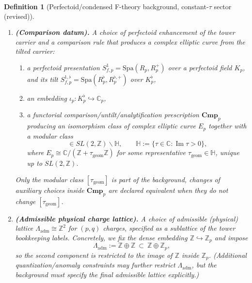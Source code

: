 \documentclass[11pt]{article}
\newtheorem{definition}[theorem]{Definition}
\theoremstyle{remark}
\begin{document}
\begin{definition}[Perfectoid/condensed F-theory background, constant-$\tau$ sector (revised)]
\begin{enumerate}
\item \textbf{(Comparison datum).}
A choice of perfectoid enhancement of the tower carrier and a comparison rule that produces a
complex elliptic curve from the tilted carrier:
\begin{enumerate}
\item a perfectoid presentation $S^{1}_{f,p}=\mathrm{Spa}(R_p,R_p^{+})$ over a perfectoid field $K_p$,
and its tilt $S^{1,\flat}_{f,p}=\mathrm{Spa}(R_p^{\flat},R_p^{\flat,+})$ over $K_p^{\flat}$,
\item an embedding $\iota_p:K_p^{\flat}\hookrightarrow \mathbb{C}_p$,
\item a functorial comparison/untilt/analytification prescription $\mathbf{Cmp}_p$ producing an isomorphism
class of complex elliptic curve $E_p$ together with a modular class
\begin{equation}
[\tau_{\mathrm{geom}}] \in SL(2,\mathbb{Z})\backslash \mathbb{H},
\qquad \mathbb{H}:=\{\tau\in\mathbb{C}:\operatorname{Im}\tau>0\},
\end{equation}
where $E_p \cong \mathbb{C}/(\mathbb{Z}+\tau_{\mathrm{geom}}\mathbb{Z})$ for some representative
$\tau_{\mathrm{geom}}\in\mathbb{H}$, unique up to $SL(2,\mathbb{Z})$.
\end{enumerate}
Only the modular class $[\tau_{\mathrm{geom}}]$ is part of the background, changes of auxiliary choices
inside $\mathbf{Cmp}_p$ are declared equivalent when they do not change $[\tau_{\mathrm{geom}}]$.

\item \textbf{(Admissible physical charge lattice).}
A choice of admissible (physical) lattice $\Lambda_{\mathrm{adm}}\cong \mathbb{Z}^{2}$ for $(p,q)$ charges,
specified as a sublattice of the tower bookkeeping labels.
Concretely, we fix the dense embedding $\mathbb{Z}\hookrightarrow \mathbb{Z}_p$ and impose
\begin{equation}
\Lambda_{\mathrm{adm}} := \mathbb{Z}\oplus \mathbb{Z}\ \subset\ \mathbb{Z}\oplus \mathbb{Z}_p,
\end{equation}
so the second component is restricted to the image of $\mathbb{Z}$ inside $\mathbb{Z}_p$.
(Additional quantization/anomaly constraints may further restrict $\Lambda_{\mathrm{adm}}$, but the
background must specify the final admissible lattice explicitly.)


\end{enumerate}
\end{definition}
\end{document}
